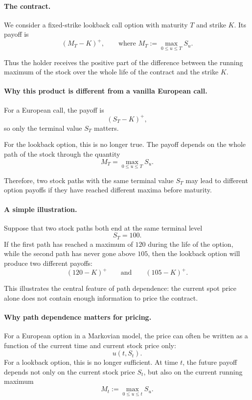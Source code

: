 \documentclass[11pt]{article}
\theoremstyle{plain}
\theoremstyle{definition}
\theoremstyle{remark}
\begin{document}
\paragraph{The contract.}
We consider a fixed-strike lookback call option with maturity \(T\) and
strike \(K\).
Its payoff is
\[
(M_T-K)^+,
\qquad
\text{where }
M_T:=\max_{0\le u\le T} S_u.
\]

Thus the holder receives the positive part of the difference between the
running maximum of the stock over the whole life of the contract and the
strike \(K\).

\paragraph{Why this product is different from a vanilla European call.}
For a European call, the payoff is
\[
(S_T-K)^+,
\]
so only the terminal value \(S_T\) matters.

For the lookback option, this is no longer true.
The payoff depends on the whole path of the stock through the quantity
\[
M_T=\max_{0\le u\le T}S_u.
\]

Therefore, two stock paths with the same terminal value \(S_T\) may lead
to different option payoffs if they have reached different maxima before
maturity.

\paragraph{A simple illustration.}
Suppose that two stock paths both end at the same terminal level
\[
S_T=100.
\]
If the first path has reached a maximum of \(120\) during the life of
the option, while the second path has never gone above \(105\), then the
lookback option will produce two different payoffs:
\[
(120-K)^+
\qquad\text{and}\qquad
(105-K)^+.
\]

This illustrates the central feature of path dependence:
the current spot price alone does not contain enough information to
price the contract.

\paragraph{Why path dependence matters for pricing.}
For a European option in a Markovian model, the price can often be
written as a function of the current time and current stock price only:
\[
u(t,S_t).
\]
For a lookback option, this is no longer sufficient.
At time \(t\), the future payoff depends not only on the current stock
price \(S_t\), but also on the current running maximum
\[
M_t:=\max_{0\le u\le t}S_u.
\]
\end{document}
